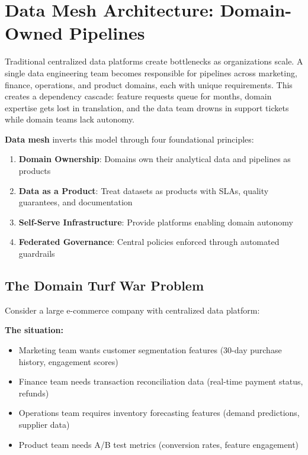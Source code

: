 \section{Data Mesh Architecture: Domain-Owned Pipelines}

Traditional centralized data platforms create bottlenecks as organizations scale. A single data engineering team becomes responsible for pipelines across marketing, finance, operations, and product domains, each with unique requirements. This creates a dependency cascade: feature requests queue for months, domain expertise gets lost in translation, and the data team drowns in support tickets while domain teams lack autonomy.

\textbf{Data mesh} inverts this model through four foundational principles:

\begin{enumerate}
    \item \textbf{Domain Ownership}: Domains own their analytical data and pipelines as products
    \item \textbf{Data as a Product}: Treat datasets as products with SLAs, quality guarantees, and documentation
    \item \textbf{Self-Serve Infrastructure}: Provide platforms enabling domain autonomy
    \item \textbf{Federated Governance}: Central policies enforced through automated guardrails
\end{enumerate}

\subsection{The Domain Turf War Problem}

Consider a large e-commerce company with centralized data platform:

\textbf{The situation:}
\begin{itemize}
    \item Marketing team wants customer segmentation features (30-day purchase history, engagement scores)
    \item Finance team needs transaction reconciliation data (real-time payment status, refunds)
    \item Operations team requires inventory forecasting features (demand predictions, supplier data)
    \item Product team needs A/B test metrics (conversion rates, feature engagement)
\end{itemize}

